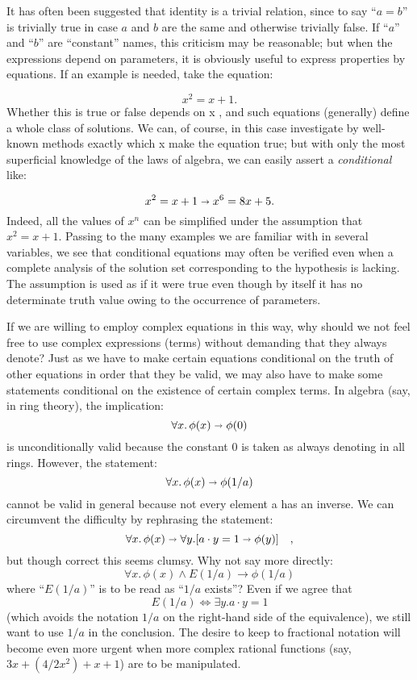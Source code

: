 It has often been suggested that identity is a trivial relation, since to say
``$a = b$'' is trivially true in case $a$ and $b$ are the same and otherwise trivially false. 
If ``$a$'' and ``$b$'' are ``constant'' names, this criticism may be reasonable; but when the expressions depend on parameters, it is obviously useful to express properties by equations. If an example is needed, take the equation:

$$
x^2 = x + 1.
$$
Whether this is true or false depends on x , and such equations (generally) define a whole class of solutions. We can, of course, in this case investigate by well- known methods exactly which x make the equation true; but with only the most superficial knowledge of the laws of algebra, we can easily assert a {\it conditional} like:

$$
x^2 = x + 1 \shortrightarrow x^6 = 8x + 5.
$$
Indeed, all the values of $x^n$ can be simplified under the assumption that $x^2 =
x + 1$. Passing to the many examples we are familiar with in several variables,
we see that conditional equations may often be verified even when a complete analysis
of the solution set corresponding to the hypothesis is lacking. The assumption
is used as if it were true even though by itself it has no determinate truth value 
owing to the occurrence of parameters.

If we are willing to employ complex equations in this way, why should we not feel 
free to use complex expressions (terms) without demanding that they always denote? Just as we have to make certain equations conditional on the truth of
other equations in order that they be valid, we may also have to make some 
statements conditional on the existence of certain complex terms. In algebra (say, in ring theory), the implication:
$$
\forall x.\, \phi(x) \shortrightarrow \phi(0)
$$
is unconditionally valid because the constant 0 is taken as always denoting in
all rings. However, the statement:
$$
\forall x.\, \phi(x) \shortrightarrow \phi(1/a)
$$
cannot be valid in general because not every element a has an inverse. We can circumvent the difficulty by rephrasing the statement:
$$
\forall x.\, \phi(x) \shortrightarrow \forall y. [ a \cdot y = 1 \shortrightarrow \phi(y) ] \quad,
$$
but though correct this seems clumsy. Why not say more directly:
$$
\forall x.\, \phi(x) \land E(1/a) \to \phi(1/a)
$$
where ``$E(1/a)$'' is to be read as ``$1/a$ exists''? Even if we agree that
$$
E(1/a) \iff \exists y. a \cdot y = 1
$$
(which avoids the notation $1/a$ on the right-hand side of the equivalence), we still want to use $1/a$ in the conclusion. 
The desire to keep to fractional notation will become even more urgent when more complex rational functions 
(say, $3x + (4 / 2x^2) + x + 1$) are to be manipulated.

